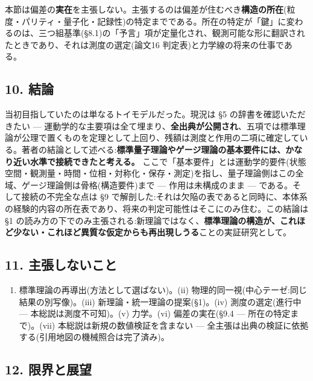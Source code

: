 \documentclass[
]{ltjsarticle}
\providecommand{\tightlist}{%
  \setlength{\itemsep}{0pt}\setlength{\parskip}{0pt}}
\begin{document}
本節は偏差の\textbf{実在}を主張しない。主張するのは偏差が住むべき\textbf{構造の所在}(粒度・パリティ・量子化・記録性)の特定までである。所在の特定が「鍵」に変わるのは、三つ組基準(§8.1)の「予言」項が定量化され、観測可能な形に翻訳されたときであり、それは測度の選定(論文16
判定表)と力学線の将来の仕事である。

\subsection{10. 結論}\label{ux7d50ux8ad6}

当初目指していたのは単なるトイモデルだった。現況は §5
の辞書を確認いただきたい ---
運動学的な主要項は全て埋まり、\textbf{全出典が公開され}、五項では標準理論が公理で置くものを定理として上回り、残額は測度と作用の二項に確定している。著者の結論として述べる:\textbf{標準量子理論やゲージ理論の基本要件には、かなり近い水準で接続できたと考える。}
ここで「基本要件」とは運動学的要件(状態空間・観測量・時間・位相・対称化・保存・測定)を指し、量子理論側はこの全域、ゲージ理論側は骨格(構造要件)まで
--- 作用は未構成のまま --- である。そして接続の不完全な点は §9
で解剖した:それは欠陥の表であると同時に、本体系の経験的内容の所在表であり、将来の判定可能性はそこにのみ住む。この結論は
§1
の読み方の下でのみ主張される:新理論ではなく、\textbf{標準理論の構造が、これほど少ない・これほど異質な仮定からも再出現しうる}ことの実証研究として。

\subsection{11.
主張しないこと}\label{ux4e3bux5f35ux3057ux306aux3044ux3053ux3068}

\begin{enumerate}
\def\labelenumi{(\roman{enumi})}
\tightlist
\item
  標準理論の再導出(方法として選ばない)。(ii)
  物理的同一視(中心テーゼ:同じ結果の別写像)。(iii)
  新理論・統一理論の提案(§1)。(iv) 測度の選定(進行中 ---
  本総説は測度不可知)。(v) 力学。(vi) 偏差の実在(§9.4 ---
  所在の特定まで)。(vii) 本総説は新規の数値検証を含まない ---
  全主張は出典の検証に依拠する(引用地図の機械照合は完了済み)。
\end{enumerate}

\subsection{12. 限界と展望}\label{ux9650ux754cux3068ux5c55ux671b}
\end{document}
